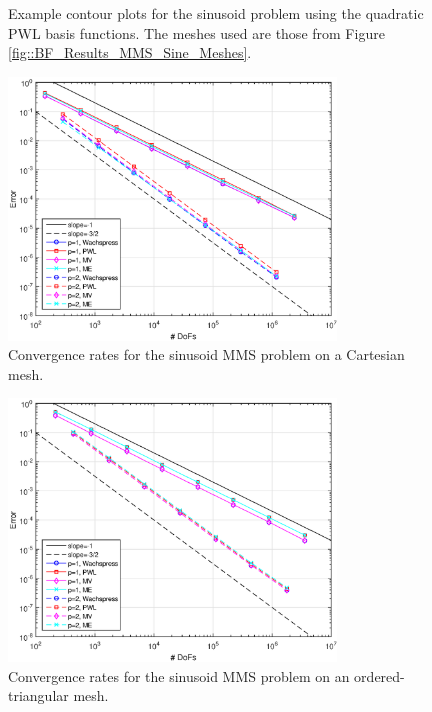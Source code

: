 \begin{figure}
{\begin{subfigure}[b]{0.45\textwidth}
	\end{subfigure}
}
\caption{Example contour plots for the sinusoid problem using the quadratic PWL basis functions. The meshes used are those from Figure \ref{fig::BF_Results_MMS_Sine_Meshes}.}
\label{fig::BF_Results_MMS_Sine_PWL2_Sol}
\end{figure}

\begin{figure}
\centering
\includegraphics[width=0.775\textwidth]{figures/sec_BF/TransMMS_Sine_cart_err.eps}
\caption{Convergence rates for the sinusoid MMS problem on a Cartesian mesh.}
\label{fig::BF_Results_MMS_Sine_cart}
\end{figure}

\begin{figure}
\centering
\includegraphics[width=0.775\textwidth]{figures/sec_BF/TransMMS_Sine_tri_err.eps}
\caption{Convergence rates for the sinusoid MMS problem on an ordered-triangular mesh.}
\label{fig::BF_Results_MMS_Sine_tri}
\end{figure}

